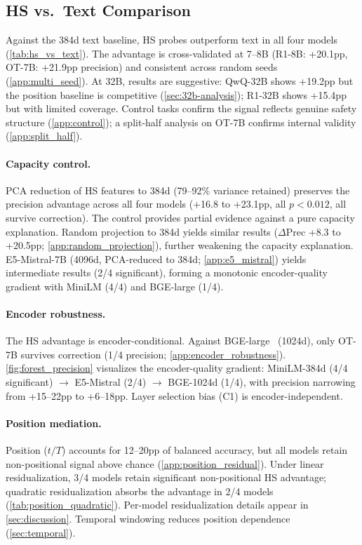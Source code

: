 \subsection{HS vs.\ Text Comparison}\label{sec:hs-text}

Against the 384d text baseline, HS probes outperform text in all four models (\cref{tab:hs_vs_text}). The advantage is cross-validated at 7--8B (R1-8B: +20.1pp, OT-7B: +21.9pp precision) and consistent across random seeds (\cref{app:multi_seed}). At 32B, results are suggestive: QwQ-32B shows +19.2pp but the position baseline is competitive (\cref{sec:32b-analysis}); R1-32B shows +15.4pp but with limited coverage. Control tasks confirm the signal reflects genuine safety structure (\cref{app:control}); a split-half analysis on OT-7B confirms internal validity (\cref{app:split_half}).

\paragraph{Capacity control.} PCA reduction of HS features to 384d (79--92\% variance retained) preserves the precision advantage across all four models (+16.8 to +23.1pp, all $p{<}0.012$, all survive correction). The control provides partial evidence against a pure capacity explanation. Random projection to 384d yields similar results ($\Delta$Prec +8.3 to +20.5pp; \cref{app:random_projection}), further weakening the capacity explanation. E5-Mistral-7B (4096d, PCA-reduced to 384d; \cref{app:e5_mistral}) yields intermediate results (2/4 significant), forming a monotonic encoder-quality gradient with MiniLM (4/4) and BGE-large (1/4).

\paragraph{Encoder robustness.} The HS advantage is encoder-conditional. Against BGE-large~\citep{xiao2023cpack} (1024d), only OT-7B survives correction (1/4 precision; \cref{app:encoder_robustness}). \cref{fig:forest_precision} visualizes the encoder-quality gradient: MiniLM-384d (4/4 significant) $\to$ E5-Mistral (2/4) $\to$ BGE-1024d (1/4), with precision narrowing from +15--22pp to +6--18pp. Layer selection bias (C1) is encoder-independent.

\paragraph{Position mediation.} Position ($t/T$) accounts for 12--20pp of balanced accuracy, but all models retain non-positional signal above chance (\cref{app:position_residual}). Under linear residualization, 3/4 models retain significant non-positional HS advantage; quadratic residualization absorbs the advantage in 2/4 models (\cref{tab:position_quadratic}). Per-model residualization details appear in \cref{sec:discussion}. Temporal windowing reduces position dependence (\cref{sec:temporal}).

